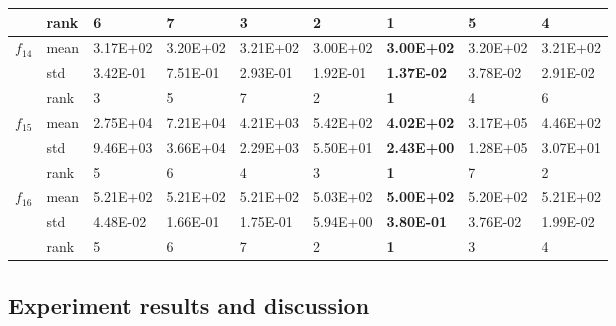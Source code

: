 \documentclass[a4paper,13pt,2p]{report}
\begin{document}
\begin{table}[!t]
\begin{tabular}{|l|l|l|l|l|l|l|l|l|}
                     & rank & 6        & 7        & 3        & 2                 & \textbf{1}         & 5        & 4                 \\ \hline
\multirow{3}{*}{$f_{14}$} & mean & 3.17E+02 & 3.20E+02 & 3.21E+02 & 3.00E+02          & \textbf{3.00E+02}  & 3.20E+02 & 3.21E+02          \\ \cline{2-9} 
                     & std  & 3.42E-01 & 7.51E-01 & 2.93E-01 & 1.92E-01          & \textbf{1.37E-02}  & 3.78E-02 & 2.91E-02          \\ \cline{2-9} 
                     & rank & 3        & 5        & 7        & 2                 & \textbf{1}         & 4        & 6                 \\ \hline
\multirow{3}{*}{$f_{15}$} & mean & 2.75E+04 & 7.21E+04 & 4.21E+03 & 5.42E+02          & \textbf{4.02E+02}  & 3.17E+05 & 4.46E+02          \\ \cline{2-9} 
                     & std  & 9.46E+03 & 3.66E+04 & 2.29E+03 & 5.50E+01          & \textbf{2.43E+00}  & 1.28E+05 & 3.07E+01          \\ \cline{2-9} 
                     & rank & 5        & 6        & 4        & 3                 & \textbf{1}         & 7        & 2                 \\ \hline
\multirow{3}{*}{$f_{16}$} & mean & 5.21E+02 & 5.21E+02 & 5.21E+02 & 5.03E+02          & \textbf{5.00E+02}  & 5.20E+02 & 5.21E+02          \\ \cline{2-9} 
                     & std  & 4.48E-02 & 1.66E-01 & 1.75E-01 & 5.94E+00          & \textbf{3.80E-01}  & 3.76E-02 & 1.99E-02          \\ \cline{2-9} 
                     & rank & 5        & 6        & 7        & 2                 & \textbf{1}         & 3        & 4                 \\ \hline
\end{tabular}
\end{table}
	
\subsection{Experiment results and discussion}
\label{exp_results}
\end{document}
